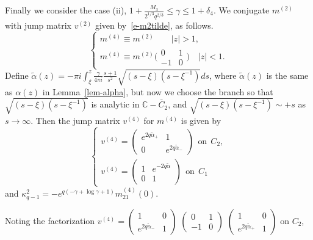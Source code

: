 \documentclass{amsart}
\theoremstyle{definition}
\theoremstyle{remark}
\numberwithin{equation}{section}
\newcommand{\C}{\mathbb C}
\newcommand{\wt}{\widetilde}
\begin{document}
\bigskip
Finally we consider the case (ii), $1+\frac{M_3}{2^{1/3}q^{2/3}}\le 
\gamma\le 1+\delta_4$.
We conjugate $m^{(2)}$ with jump matrix $v^{(2)}$ given 
by~\eqref{e-m2tilde}, as follows.\\
\begin{equation}
 \begin{cases}
    m^{(4)} \equiv m^{(2)} \qquad |z|>1,\\
    m^{(4)} \equiv m^{(2)} \bigl(\begin{smallmatrix} 0& 1\\-1&0 \end{smallmatrix} \bigr)
\quad |z|<1.
 \end{cases}
\end{equation}
Define $\wt{\alpha}(z)= -\pi i \int^z_\xi \frac\gamma{4\pi i} 
\frac{s+1}{s^2}\sqrt{(s-\xi)(s - \xi^{-1})}ds$, 
where $\wt{\alpha}(z)$ is the same as $\alpha(z)$ in Lemma~\ref{lem-alpha}, but 
now we choose the branch so that 
$\sqrt{(s-\xi)(s - \xi^{-1})}$ is analytic in $\C-\bar{C}_2$, and 
$\sqrt{(s-\xi)(s - \xi^{-1})} \sim +s$ as $s\to\infty$.
Then the jump matrix $v^{(4)}$ for $m^{(4)}$ is given by
\begin{equation}
 \begin{cases}
  v^{(4)}= \begin{pmatrix} e^{2q\wt{\alpha}_+} &1\\ 0&e^{2q\wt{\alpha}_-} 
\end{pmatrix} \ \ \text{on} \ \ C_2,\\
  v^{(4)}= \begin{pmatrix} 1&e^{-2q\wt{\alpha}}\\ 0&1 \end{pmatrix} \ \ \text{on} 
\ \ C_1
 \end{cases}
\end{equation}
and $\kappa^2_{q-1}=-e^{q(-\gamma+\log \gamma+1)}m^{(4)}_{21}(0)$.
\begin{figure}[ht]
 \centerline{}
 \caption{}\label{fig-Ctilde}
\end{figure}
Noting the factorization $v^{(4)}=\begin{pmatrix} 
1&0\\ e^{2q\wt{\alpha}_-}&1 \end{pmatrix}$
$\begin{pmatrix} 0&1\\-1&0 \end{pmatrix}$
$\begin{pmatrix} 1&0\\e^{2q\wt{\alpha}_+}&1 \end{pmatrix}$ on $C_2$,
\end{document}

